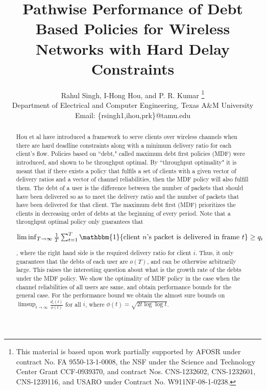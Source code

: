 \documentclass[letterpaper, 10 pt, conference]{ieeeconf}
\title{\bf{Pathwise Performance of Debt Based Policies for Wireless Networks with Hard Delay Constraints
}}
\author{Rahul Singh, I-Hong Hou, and P. R. Kumar
  \thanks{This material is based upon work partially supported by AFOSR under contract No. FA 9550-13-1-0008, the NSF under the Science and Technology Center Grant CCF-0939370, and contract Nos. CNS-1232602, CNS-1232601, CNS-1239116, and USARO under Contract No. W911NF-08-1-0238.}
   \\Department of Electrical and Computer Engineering, Texas A\&M University
   \\Email: \{rsingh1,ihou,prk\}@tamu.edu
}
\begin{document}
\maketitle
\begin{abstract}
Hou et al have introduced  a framework to serve clients over wireless channels when there are hard deadline constraints along with a minimum delivery ratio for each client's flow. Policies based on ``debt," called maximum debt first
policies (MDF) were introduced, and shown to be throughput optimal. By ``throughput optimality" it is meant
that if there exists a policy that fulfils a set of clients with a given vector of delivery ratios and a vector of channel reliabilities, then the MDF policy will also fulfill them. The debt of a user is the difference between the number of packets that should have been delivered so as to meet the delivery ratio and the number of packets that have been delivered for that client. The maximum debt first (MDF) prioritizes the clients in decreasing order of debts at the beginning of every period. 
Note that a throughput optimal policy only guarantees that
\begin{small} 
$\liminf_{T \to \infty} \frac{1}{T}\sum_{t=1}^{T} \mathbbm{1}\{ \mbox{client $n$'s packet is delivered in frame $t$} \}\\ \geq q_{i}$
\end{small}, where the right hand side is the required delivery ratio for client $i$. Thus, it only guarantees that the debts of each user are $o(T)$, and can be otherwise arbitrarily large. This raises the interesting question about what is the growth rate of the debts under the MDF policy.
We show the optimality of MDF policy in the case when the channel reliabilities of all users are same, and obtain performance bounds for the general case. For the performance bound we obtain the almost sure bounds on $\limsup_{t\to\infty}\frac{d_{i}(t) }{\phi(t)}$ for all $i$, where $\phi(t) = \sqrt{2t\log\log t}$.
\end{abstract}
\end{document}
